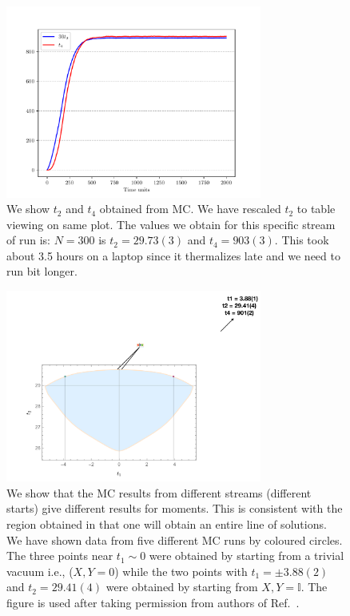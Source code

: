 \documentclass[11pt]{article}
\begin{document}
\begin{figure}[htbp] 
	\centering 
	\includegraphics[width=0.75\textwidth]{figs/2MM_symb_t2_t4.pdf}
	\caption{\label{fig:2MM_t2t4}We show $t_{2}$ and $t_{4}$ obtained from MC. We have rescaled $t_{2}$ to
	table viewing on same plot. The values we obtain for this specific stream of run is: $N=300$ is $t_{2} = 29.73(3)$ and $t_{4} = 903(3)$. This took about 3.5 hours on a laptop since it thermalizes late and we need to run bit longer.}
\end{figure}

\begin{figure}[h] 
	\centering 
	\includegraphics[width=0.75\textwidth]{figs/2MM_symb_ms.pdf}
	\caption{\label{fig:2MM_comp1}We show that the MC results from different streams (different starts) give different results for moments. This is consistent with the region obtained in \cite{Kazakov:2021lel} that one will obtain an entire line of solutions. We have shown data from five different MC runs by coloured circles. The three points near $t_{1} \sim 0$ were obtained by starting from a trivial vacuum i.e., ($X,Y = 0$) while the two points with $t_{1} = \pm 3.88(2)$ and $t_{2}=29.41(4)$ were obtained by starting from $X,Y = \mathbb{I}$. 
The figure is used after taking permission from authors of Ref.~\cite{Kazakov:2021lel}.}
\end{figure}
\end{document}
